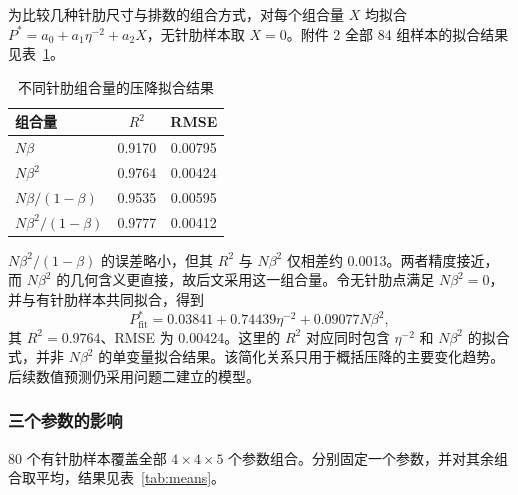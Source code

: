 \documentclass[withoutpreface,bwprint]{cumcmthesis}
\newcommand{\Pstar}{P^{*}}
\begin{document}
为比较几种针肋尺寸与排数的组合方式，对每个组合量 $X$ 均拟合 $\Pstar=a_0+a_1\eta^{-2}+a_2X$，无针肋样本取 $X=0$。附件 2 全部 84 组样本的拟合结果见表~\ref{tab:congestion}。
\begin{table}[H]
\centering
\caption{不同针肋组合量的压降拟合结果}
\label{tab:congestion}
\begin{tabular}{lcc}
\toprule
组合量 & $R^2$ & RMSE\\
\midrule
$N\beta$ & 0.9170 & 0.00795\\
$N\beta^2$ & 0.9764 & 0.00424\\
$N\beta/(1-\beta)$ & 0.9535 & 0.00595\\
$N\beta^2/(1-\beta)$ & 0.9777 & 0.00412\\
\bottomrule
\end{tabular}
\end{table}
$N\beta^2/(1-\beta)$ 的误差略小，但其 $R^2$ 与 $N\beta^2$ 仅相差约 0.0013。两者精度接近，而 $N\beta^2$ 的几何含义更直接，故后文采用这一组合量。令无针肋点满足 $N\beta^2=0$，并与有针肋样本共同拟合，得到
\begin{equation}
\Pstar_{\mathrm{fit}}=0.03841+0.74439\eta^{-2}+0.09077N\beta^2,
\end{equation}
其 $R^2=0.9764$、RMSE 为 0.00424。这里的 $R^2$ 对应同时包含 $\eta^{-2}$ 和 $N\beta^2$ 的拟合式，并非 $N\beta^2$ 的单变量拟合结果。该简化关系只用于概括压降的主要变化趋势。后续数值预测仍采用问题二建立的模型。

\subsubsection{三个参数的影响}
80 个有针肋样本覆盖全部 $4\times4\times5$ 个参数组合。分别固定一个参数，并对其余组合取平均，结果见表~\ref{tab:means}。
\end{document}
